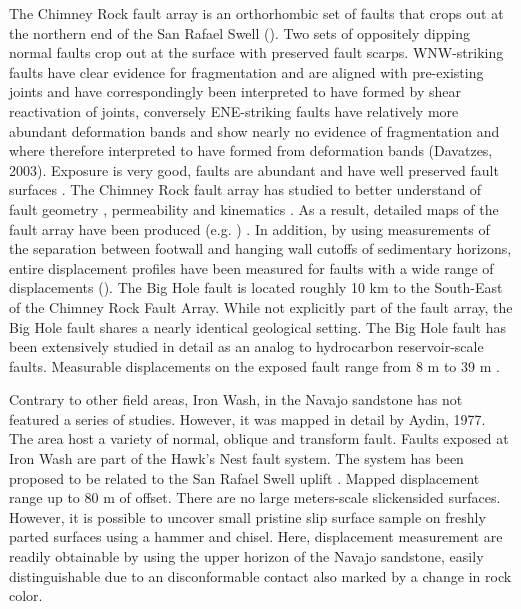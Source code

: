 \documentclass[12pt,a4paper]{article}
\begin{document}
	The Chimney Rock fault array is an orthorhombic set of faults that crops out at the northern end of the San Rafael Swell (\cite{krantz1986orthorhombic, davatzes2003overprinting}). Two sets of oppositely dipping normal faults crop out at the surface with preserved fault scarps. WNW-striking faults have clear evidence for fragmentation and are aligned with pre-existing joints and have correspondingly been interpreted to have formed by shear reactivation of joints, conversely ENE-striking faults have relatively more abundant deformation bands and show nearly no evidence of fragmentation and where therefore interpreted to have formed from deformation bands (Davatzes, 2003). Exposure is very good, faults are abundant and have well preserved fault surfaces \cite{vrolijk2005anatomy}. The Chimney Rock fault array has studied to better understand of fault geometry \cite{shipton2001damage, shipton2003conceptual}, permeability \cite{shipton2002structural} and kinematics \cite{krantz1986orthorhombic, krantz1986orthorhombic, maerten2001digital, davatzes2003overprinting}. As a result, detailed maps of the fault array have been produced (e.g. \cite{maerten2001digital}) . In addition, by using measurements of the separation between footwall and hanging wall cutoffs of sedimentary horizons, entire displacement profiles have been measured for faults with a wide range of displacements (\cite{cowie1998fault, maerten2001digital, shipton2001damage, shipton2003conceptual}). The Big Hole fault is located roughly 10 km to the South-East of the Chimney Rock Fault Array. While not explicitly part of the fault array, the Big Hole fault shares a nearly identical geological setting. The Big Hole fault has been extensively studied in detail as an analog to hydrocarbon reservoir-scale faults. Measurable displacements on the exposed fault range from 8 m to 39 m \cite{shipton2001damage, shipton2003conceptual}. 

	Contrary to other field areas, Iron Wash, in the Navajo sandstone has not featured a series of studies. However, it was mapped in detail by Aydin, 1977. The area host a variety of normal, oblique and transform fault. Faults exposed at Iron Wash are part of the Hawk's Nest fault system. The system has been proposed to be  related to the San Rafael Swell uplift \cite{kelley1960fracture}.  Mapped displacement range up to 80 m of offset. There are no large meters-scale slickensided surfaces. However, it is possible to uncover small pristine slip surface sample on freshly parted surfaces using a hammer and chisel. Here, displacement measurement are readily obtainable by using the upper horizon of the Navajo sandstone, easily distinguishable due to an disconformable contact also marked by a change in rock color. 
\end{document}
